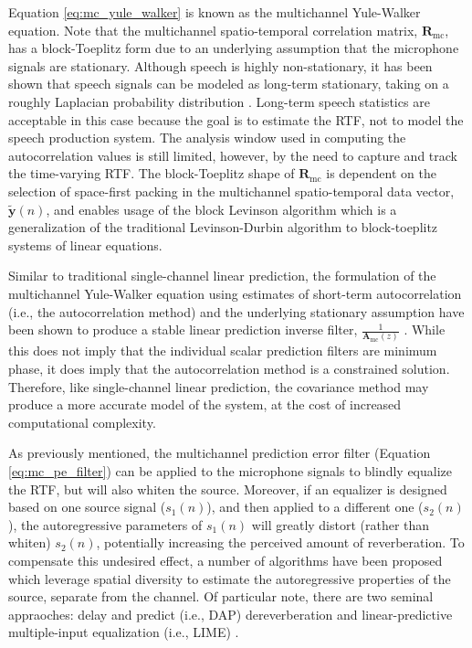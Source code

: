 Equation \ref{eq:mc_yule_walker} is known as the multichannel Yule-Walker equation. Note that the multichannel spatio-temporal correlation matrix, $\boldsymbol{R}_{\mathrm{mc}}$, has a block-Toeplitz form due to an underlying assumption that the microphone signals are stationary. Although speech is highly non-stationary, it has been shown that speech signals can be modeled as long-term stationary, taking on a roughly Laplacian probability distribution \citep{gazor2003speech}. Long-term speech statistics are acceptable in this case because the goal is to estimate the RTF, not to model the speech production system. The analysis window used in computing the autocorrelation values is still limited, however, by the need to capture and track the time-varying RTF. The block-Toeplitz shape of  $\boldsymbol{R}_{\mathrm{mc}}$ is dependent on the selection of space-first packing in the multichannel spatio-temporal data vector, $\boldsymbol{\tilde{y}}(n)$, and enables usage of the block Levinson algorithm \citep[i.e., the multichannel Levinson algorithm, ][]{whittle1963fitting} which is a generalization of the traditional Levinson-Durbin algorithm to block-toeplitz systems of linear equations.

Similar to traditional single-channel linear prediction, the formulation of the multichannel Yule-Walker equation using estimates of short-term autocorrelation (i.e., the autocorrelation method) and the underlying stationary assumption have been shown to produce a stable linear prediction inverse filter, $\frac{1}{\boldsymbol{A}_{\mathrm{mc}}(z)}$ \citep{inouye1983modeling}. While this does not imply that the individual scalar prediction filters are minimum phase, it does imply that the autocorrelation method is a constrained solution. Therefore, like single-channel linear prediction, the covariance method may produce a more accurate model of the system, at the cost of increased computational complexity.

As previously mentioned, the multichannel prediction error filter (Equation \ref{eq:mc_pe_filter}) can be applied to the microphone signals to blindly equalize the RTF, but will also whiten the source. Moreover, if an equalizer is designed based on one source signal ($s_1(n)$), and then applied to a different one ($s_2(n)$), the autoregressive parameters of $s_1(n)$  will greatly distort (rather than whiten) $s_2(n)$, potentially increasing the perceived amount of reverberation. To compensate this undesired effect, a number of algorithms have been proposed which leverage spatial diversity to estimate the autoregressive properties of the source, separate from the channel.  Of particular note, there are two seminal appraoches: delay and predict (i.e., DAP) dereverberation \citep{triki2006delay} and linear-predictive multiple-input equalization (i.e., LIME) \citep{delcroix2007precise}.

